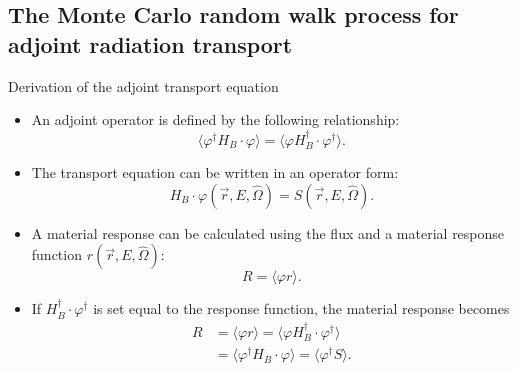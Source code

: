 \documentclass{beamer}
\begin{document}
\subsection{The Monte Carlo random walk process for adjoint radiation transport}
\begin{frame}{Derivation of the adjoint transport equation}

  \begin{itemize}
    \item An adjoint operator is defined by the following relationship:
      \begin{equation*}
        \langle \varphi^{\dagger}H_B \cdot \varphi \rangle = 
        \langle \varphi H_B^{\dagger} \cdot \varphi^{\dagger} \rangle.
      \end{equation*}
    \item The transport equation can be written in an operator form:
      \begin{equation*}
        H_B \cdot \varphi(\vec{r},E,\hat{\Omega}) = S(\vec{r},E,\hat{\Omega}).
      \end{equation*}
    \item A material response can be calculated using the flux and a material
      response function $r(\vec{r},E,\hat{\Omega})$:
      \begin{equation*}
        R = \langle \varphi r \rangle.
      \end{equation*}
    \item If $H_B^{\dagger} \cdot \varphi^{\dagger}$ is set equal to the response 
      function, the material response becomes
      \begin{align}
        R & = \langle \varphi r \rangle 
        = \langle \varphi H_B^{\dagger} \cdot \varphi^{\dagger} \rangle \nonumber \\
        & = \langle \varphi^{\dagger}H_B \cdot \varphi \rangle
        = \langle \varphi^{\dagger} S \rangle \nonumber.
      \end{align}
  \end{itemize}

\end{frame}
\end{document}
